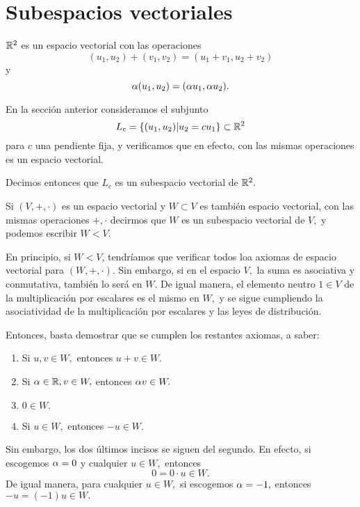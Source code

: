 \section{Subespacios vectoriales}



\begin{problema}
 $\mathbb{R}^{2}$ es un espacio vectorial con las operaciones $$(u_{1},u_{2})+(v_{1},v_{2})=(u_{1}+v_{1},u_{2}+v_{2})$$ y
$$\alpha(u_{1}, u_{2})=(\alpha u_{1}, \alpha u_{2}).$$

En la secci\'on anterior consideramos el subjunto $$L_{c}=\left\{ (u_{1},u_{2})|u_{2}=c u_{1} \right\}\subset \mathbb{R}^{2}$$ para  $c$
una pendiente fija, y verificamos que en efecto, con las mismas operaciones es un espacio vectorial.

Decimos entonces que $L_{c}$ es un subespacio vectorial de $\mathbb{R}^{2}.$
\end{problema}

\begin{definicion}
 Si $(V, +, \cdot )$ es un espacio vectorial  y
$W\subset V$ es tambi\'en espacio vectorial, con las mismas operaciones $+,\cdot$ decirmos que $W$ es un subespacio
vectorial de $V,$ y podemos escribir $W < V.$
\end{definicion}

En principio, si $W < V$, tendr\'iamos que verificar todos loa axiomas de espacio vectorial para $(W, +, \cdot).$ Sin
embargo, si en el espacio $V,$ la suma es asociativa y conmutativa, tambi\'en lo será en $W.$ De igual manera, el
elemento neutro $1\in V$ de la multiplicaci\'on por escalares es el mismo en $W,$ y se sigue cumpliendo la
asociatividad de la multiplicaci\'on por escalares y las leyes de distribuci\'on.

Entonces, basta demostrar que se cumplen los restantes axiomas, a saber:
\begin{enumerate}
 \item Si $u,v \in W,$ entonces $u+v\in W.$
 \item Si $\alpha \in \mathbb{R}, v \in W,$ entonces $\alpha v\in W.$
 \item $0\in W.$
 \item Si $u\in W,$ entonces $-u\in W.$
\end{enumerate}

Sin embargo, los dos últimos incisos se siguen del segundo. En efecto, si escogemos $\alpha=0$ y cualquier $u\in
W,$ entonces
$$
0=0\cdot u \in W.
$$
De igual manera, para cualquier $u\in W,$ si escogemos $\alpha=-1,$ entonces $-u=(-1)u\in W.$

